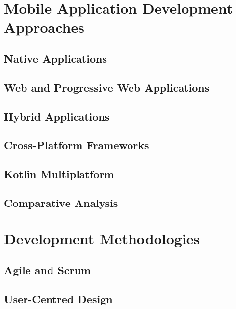 \section{Mobile Application Development Approaches}
\label{sec:sota-mobile}

\subsection{Native Applications}
\label{subsec:sota-native}

\subsection{Web and Progressive Web Applications}
\label{subsec:sota-pwa}

\subsection{Hybrid Applications}
\label{subsec:sota-hybrid}

\subsection{Cross-Platform Frameworks}
\label{subsec:sota-crossplatform}

\subsection{Kotlin Multiplatform}
\label{subsec:sota-kmp}

\subsection{Comparative Analysis}
\label{subsec:sota-mobile-comparison}

\section{Development Methodologies}
\label{sec:sota-methodologies}

\subsection{Agile and Scrum}
\label{subsec:sota-agile}

\subsection{User-Centred Design}
\label{subsec:sota-ucd}

